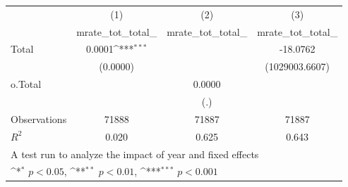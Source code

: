 {
\def\sym#1{\ifmmode^{#1}\else\(^{#1}\)\fi}
\begin{tabular}{l*{3}{c}}
\hline\hline
                    &\multicolumn{1}{c}{(1)}&\multicolumn{1}{c}{(2)}&\multicolumn{1}{c}{(3)}\\
                    &\multicolumn{1}{c}{mrate\_tot\_total\_}&\multicolumn{1}{c}{mrate\_tot\_total\_}&\multicolumn{1}{c}{mrate\_tot\_total\_}\\
\hline
Total               &      0.0001\sym{***}&                     &    -18.0762         \\
                    &    (0.0000)         &                     &(1029003.6607)         \\
o.Total             &                     &      0.0000         &                     \\
                    &                     &         (.)         &                     \\
\hline
Observations        &       71888         &       71887         &       71887         \\
\(R^{2}\)           &       0.020         &       0.625         &       0.643         \\
\hline\hline
\multicolumn{4}{l}{\footnotesize A test run to analyze the impact of year and fixed effects}\\
\multicolumn{4}{l}{\footnotesize \sym{*} \(p<0.05\), \sym{**} \(p<0.01\), \sym{***} \(p<0.001\)}\\
\end{tabular}
}

